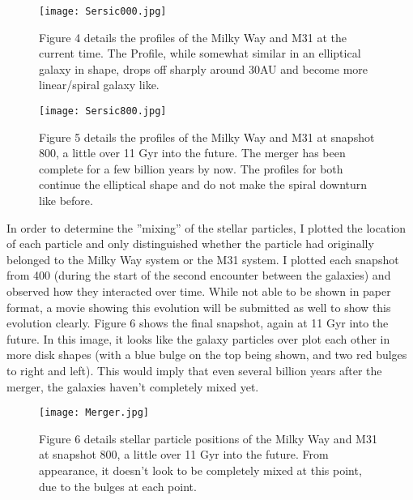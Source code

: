 \documentclass[twocolumn]{aastex63}
\begin{document}
 \begin{figure}[h]
    \centering
    \texttt{[image: Sersic000.jpg]}
    \caption{Figure 4 details the profiles of the Milky Way and M31 at the current time. The Profile, while somewhat similar in an elliptical galaxy in shape, drops off sharply around 30AU and become more linear/spiral galaxy like.}
    \label{fig:fig_5}
\end{figure}

\begin{figure}[h]
    \centering
    \texttt{[image: Sersic800.jpg]}
    \caption{Figure 5 details the profiles of the Milky Way and M31 at snapshot 800, a little over 11 Gyr into the future. The merger has been complete for a few billion years by now. The profiles for both continue the elliptical shape and do not make the spiral downturn like before.}
    \label{fig:fig_5}
\end{figure}


\bigskip


In order to determine the ''mixing'' of the stellar particles, I plotted the location of each particle and only distinguished whether the particle had originally belonged to the Milky Way system or the M31 system. I plotted each snapshot from 400 (during the start of the second encounter between the galaxies) and observed how they interacted over time. While not able to be shown in paper format, a movie showing this evolution will be submitted as well to show this evolution clearly. Figure 6 shows the final snapshot, again at 11 Gyr into the future. In this image, it looks like the galaxy particles over plot each other in more disk shapes (with a blue bulge on the top being shown, and two red bulges to right and left). This would imply that even several billion years after the merger, the galaxies haven't completely mixed yet. 

\begin{figure}[h]
    \centering
    \texttt{[image: Merger.jpg]}
    \caption{Figure 6 details stellar particle positions of the Milky Way and M31 at snapshot 800, a little over 11 Gyr into the future. From appearance, it doesn't look to be completely mixed at this point, due to the bulges at each point.}
    \label{fig:fig_6}
\end{figure}

\medskip

\end{document}
